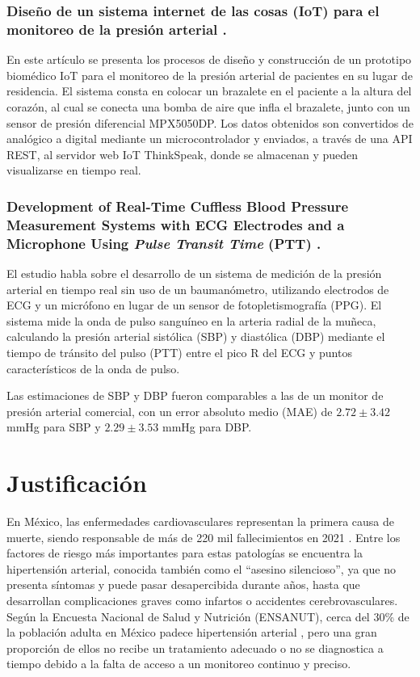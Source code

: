     \subsubsection*{Diseño de un sistema internet de las cosas (IoT) para el monitoreo de la presión arterial \cite{Estrada_2021}. }

    En este artículo se presenta los procesos de diseño y construcción de un prototipo biomédico IoT para el monitoreo de la presión arterial de pacientes en su lugar de residencia. El sistema consta en colocar un brazalete en el paciente a la altura del corazón, al cual se conecta una bomba de aire que infla el brazalete, junto con un sensor de presión diferencial MPX5050DP. Los datos obtenidos son convertidos de analógico a digital mediante un microcontrolador y enviados, a través de una API REST, al servidor web IoT ThinkSpeak, donde se almacenan y pueden visualizarse en tiempo real.

    \subsubsection*{Development of Real-Time Cuffless Blood Pressure Measurement Systems with ECG Electrodes and a Microphone Using \textit{Pulse Transit Time} (PTT) \cite{Electrodes_Microphone}.}

    El estudio habla sobre el desarrollo de un sistema de medición de la presión arterial en tiempo real sin uso de un baumanómetro, utilizando electrodos de ECG y un micrófono en lugar de un sensor de fotopletismografía (PPG). El sistema mide la onda de pulso sanguíneo en la arteria radial de la muñeca, calculando la presión arterial sistólica (SBP) y diastólica (DBP) mediante el tiempo de tránsito del pulso (PTT) entre el pico R del ECG y puntos característicos de la onda de pulso.
    
    Las estimaciones de SBP y DBP fueron comparables a las de un monitor de presión arterial comercial, con un error absoluto medio (MAE) de $2.72 \pm 3.42$ mmHg para SBP y $2.29 \pm 3.53$ mmHg para DBP.


\newpage
\section{Justificación}

En México, las enfermedades cardiovasculares representan la primera causa de muerte, siendo responsable de más de 220 mil fallecimientos en 2021 \cite{SSFallecimientos}. Entre los factores de riesgo más importantes para estas patologías se encuentra la hipertensión arterial, conocida también como el ``asesino silencioso'', ya que no presenta síntomas y puede pasar desapercibida durante años, hasta que desarrollan complicaciones graves como infartos o accidentes cerebrovasculares. Según la Encuesta Nacional de Salud y Nutrición (ENSANUT), cerca del 30\% de la población adulta en México padece hipertensión arterial \cite{ENSANUT}, pero una gran proporción de ellos no recibe un tratamiento adecuado o no se diagnostica a tiempo debido a la falta de acceso a un monitoreo continuo y preciso.

